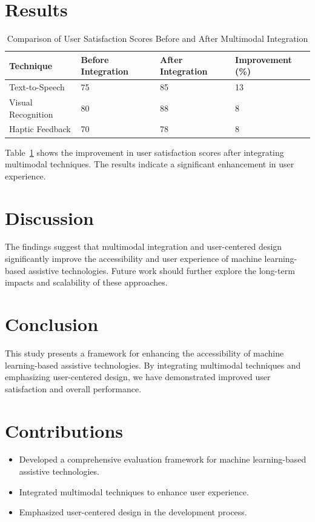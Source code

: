 \documentclass{article}
\begin{document}
\section{Results}
\label{sec:results}
\begin{table}[ht]
\centering
\caption{Comparison of User Satisfaction Scores Before and After Multimodal Integration}
\label{tab:user_satisfaction}
\begin{tabular}{@{}llll@{}}
\toprule
\textbf{Technique} & \textbf{Before Integration} & \textbf{After Integration} & \textbf{Improvement (\%)} \\ \midrule
Text-to-Speech & 75 & 85 & 13 \\
Visual Recognition & 80 & 88 & 8 \\
Haptic Feedback & 70 & 78 & 8 \\ \bottomrule
\end{tabular}
\end{table}

Table~\ref{tab:user_satisfaction} shows the improvement in user satisfaction scores after integrating multimodal techniques. The results indicate a significant enhancement in user experience.

\section{Discussion}
The findings suggest that multimodal integration and user-centered design significantly improve the accessibility and user experience of machine learning-based assistive technologies. Future work should further explore the long-term impacts and scalability of these approaches.

\section{Conclusion}
This study presents a framework for enhancing the accessibility of machine learning-based assistive technologies. By integrating multimodal techniques and emphasizing user-centered design, we have demonstrated improved user satisfaction and overall performance.

\section{Contributions}
\begin{itemize}
    \item Developed a comprehensive evaluation framework for machine learning-based assistive technologies.
    \item Integrated multimodal techniques to enhance user experience.
    \item Emphasized user-centered design in the development process.
\end{itemize}



\end{document}
